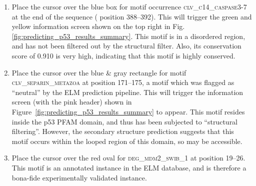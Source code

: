 \documentclass[12pt]{article}
\newcommand\motif[1]{%
    \textsc{\lowercase{#1}}%
}
\begin{document}
\begin{enumerate}

\item Place the cursor over the blue box for motif occurrence
	\motif{CLV\_C14\_Caspase3-7} at the end of the sequence (
	position 388--392). This will trigger the green and yellow
	information screen shown on the top right in Fig.
	\ref{fig:predicting_p53_results_summary}.
	This motif is in a disordered region, and has not been
	filtered out by the structural filter. Also, its conservation score
	of 0.910 is very high, indicating that this motif is highly conserved.


\item \label{sec:predicting_p53_results_structure_filter} Place the cursor over the blue \& gray rectangle for motif
	\motif{CLV\_Separin\_Metazoa} at position 171--175, a motif
	which was flagged as ``neutral'' by the ELM prediction pipeline.
	This will trigger the information screen (with the pink header) shown
	in Figure~\ref{fig:predicting_p53_results_summary} to appear.
	This motif resides inside the p53 PFAM domain, and thus has been
	subjected to ``structural filtering''. However, the secondary structure
	prediction suggests that this motif occurs within the looped region of this
	domain, so may be accessible.


\item Place the cursor over the red oval for \motif{DEG\_MDM2\_SWIB\_1} at
	position 19--26. This motif is an annotated instance in the
	ELM database, and is therefore a bona-fide experimentally validated
	instance.


\end{enumerate}
\end{document}
